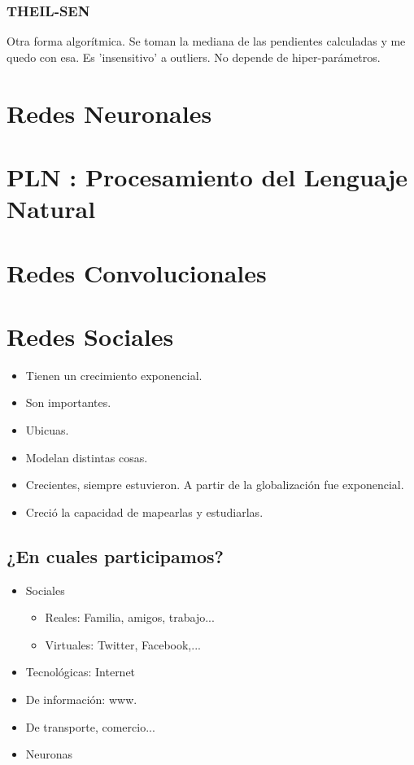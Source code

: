 \documentclass[titlepage,a4paper]{article}
\begin{document}
\subsubsection{THEIL-SEN}
Otra forma algorítmica. Se toman la mediana de las pendientes calculadas y me quedo con esa. Es 'insensitivo' a outliers. No depende de hiper-parámetros.


\section{Redes Neuronales}


\section{PLN : Procesamiento del Lenguaje Natural}


\section{Redes Convolucionales}


\section{Redes Sociales}
\begin{itemize}
    \item Tienen un crecimiento exponencial.
    \item Son importantes.
    \item Ubicuas.
    \item Modelan distintas cosas.
    \item Crecientes, siempre estuvieron. A partir de la globalización fue exponencial.
    \item Creció la capacidad de mapearlas y estudiarlas.
\end{itemize}

\subsection{¿En cuales participamos?}
\begin{itemize}
    \item Sociales
    \begin{itemize}
        \item Reales: Familia, amigos, trabajo...
        \item Virtuales: Twitter, Facebook,...
    \end{itemize}
    \item Tecnológicas: Internet
    \item De información: www.
    \item De transporte, comercio...
    \item Neuronas
\end{itemize}
\end{document}
